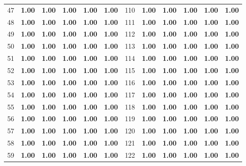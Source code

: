 \documentclass{article}
\begin{document}
{\begin{longtable}{cccccc@{\qquad}cccccc}
47 & \textbf{1.00} & \textbf{1.00} & \textbf{1.00} & \textbf{1.00} & \textbf{1.00} & 110 & \textbf{1.00} & \textbf{1.00} & \textbf{1.00} & \textbf{1.00} & \textbf{1.00} \\
48 & \textbf{1.00} & \textbf{1.00} & \textbf{1.00} & \textbf{1.00} & \textbf{1.00} & 111 & \textbf{1.00} & \textbf{1.00} & \textbf{1.00} & \textbf{1.00} & \textbf{1.00} \\
49 & \textbf{1.00} & \textbf{1.00} & \textbf{1.00} & \textbf{1.00} & \textbf{1.00} & 112 & \textbf{1.00} & \textbf{1.00} & \textbf{1.00} & \textbf{1.00} & \textbf{1.00} \\
50 & \textbf{1.00} & \textbf{1.00} & \textbf{1.00} & \textbf{1.00} & \textbf{1.00} & 113 & \textbf{1.00} & \textbf{1.00} & \textbf{1.00} & \textbf{1.00} & \textbf{1.00} \\
51 & \textbf{1.00} & \textbf{1.00} & \textbf{1.00} & \textbf{1.00} & \textbf{1.00} & 114 & \textbf{1.00} & \textbf{1.00} & \textbf{1.00} & \textbf{1.00} & \textbf{1.00} \\
52 & \textbf{1.00} & \textbf{1.00} & \textbf{1.00} & \textbf{1.00} & \textbf{1.00} & 115 & \textbf{1.00} & \textbf{1.00} & \textbf{1.00} & \textbf{1.00} & \textbf{1.00} \\
53 & \textbf{1.00} & \textbf{1.00} & \textbf{1.00} & \textbf{1.00} & \textbf{1.00} & 116 & \textbf{1.00} & \textbf{1.00} & \textbf{1.00} & \textbf{1.00} & \textbf{1.00} \\
54 & \textbf{1.00} & \textbf{1.00} & \textbf{1.00} & \textbf{1.00} & \textbf{1.00} & 117 & \textbf{1.00} & \textbf{1.00} & \textbf{1.00} & \textbf{1.00} & \textbf{1.00} \\
55 & \textbf{1.00} & \textbf{1.00} & \textbf{1.00} & \textbf{1.00} & \textbf{1.00} & 118 & \textbf{1.00} & \textbf{1.00} & \textbf{1.00} & \textbf{1.00} & \textbf{1.00} \\
56 & \textbf{1.00} & \textbf{1.00} & \textbf{1.00} & \textbf{1.00} & \textbf{1.00} & 119 & \textbf{1.00} & \textbf{1.00} & \textbf{1.00} & \textbf{1.00} & \textbf{1.00} \\
57 & \textbf{1.00} & \textbf{1.00} & \textbf{1.00} & \textbf{1.00} & \textbf{1.00} & 120 & \textbf{1.00} & \textbf{1.00} & \textbf{1.00} & \textbf{1.00} & \textbf{1.00} \\
58 & \textbf{1.00} & \textbf{1.00} & \textbf{1.00} & \textbf{1.00} & \textbf{1.00} & 121 & \textbf{1.00} & \textbf{1.00} & \textbf{1.00} & \textbf{1.00} & \textbf{1.00} \\
59 & \textbf{1.00} & \textbf{1.00} & \textbf{1.00} & \textbf{1.00} & \textbf{1.00} & 122 & \textbf{1.00} & \textbf{1.00} & \textbf{1.00} & \textbf{1.00} & \textbf{1.00} \\

\end{longtable}}
\end{document}
